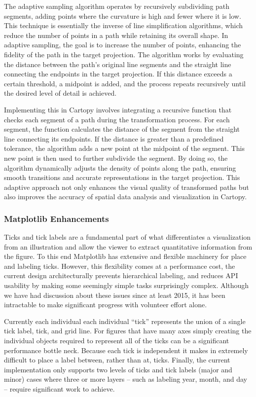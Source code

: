 \documentclass[12pt]{article}
\numberwithin{page}{section}
\begin{document}
The adaptive sampling algorithm operates by recursively subdividing path segments,
adding points where the curvature is high and fewer where it is low.
This technique is essentially the inverse of line simplification algorithms,
which reduce the number of points in a path while retaining its overall shape.
In adaptive sampling, the goal is to increase the number of points, enhancing the
fidelity of the path in the target projection. The algorithm works by evaluating
the distance between the path's original line segments and the straight line
connecting the endpoints in the target projection. If this distance exceeds a
certain threshold, a midpoint is added, and the process repeats recursively until
the desired level of detail is achieved.

Implementing this in Cartopy involves integrating a recursive function that checks
each segment of a path during the transformation process. For each segment, the
function calculates the distance of the segment from the straight line connecting
its endpoints. If the distance is greater than a predefined tolerance, the algorithm
adds a new point at the midpoint of the segment. This new point is then used to further subdivide
the segment. By doing so, the algorithm dynamically adjusts the density of points along the path,
ensuring smooth transitions and accurate representations in the target projection.
This adaptive approach not only enhances the visual quality of transformed paths
but also improves the accuracy of spatial data analysis and visualization in Cartopy.

\subsubsection{Matplotlib Enhancements}

Ticks and tick labels are a fundamental part of what differentiates a
visualization from an illustration and allow the viewer to extract quantitative
information from the figure.  To this end Matplotlib has extensive and flexible
machinery for place and labeling ticks.  However, this flexibility comes at a
performance cost, the current design architecturally prevents hierarchical
labeling, and reduces API usability by making some seemingly simple tasks
surprisingly complex. Although we have had discussion about these issues since
at least 2015, it has been intractable to make significant progress with
volunteer effort alone.


Currently each individual each individual ``tick''
represents the union of a single tick label, tick, and grid line.  For
figures that have many axes simply creating the individual objects required
to represent all of the ticks can be a significant performance bottle neck.
Because each tick is independent it makes in extremely difficult to place a label
between, rather than at, ticks.  Finally, the current implementation only supports
two levels of ticks and tick labels (major and minor) cases where three or more layers --
such as labeling year, month, and day -- require significant work to achieve.
\end{document}

